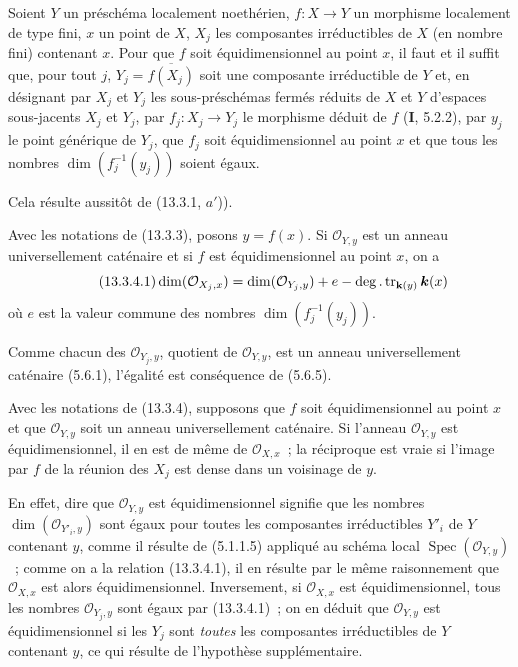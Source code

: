 \begin{proposition}[13.3.3]
\label{IV.13.3.3-fr}
Soient $Y$ un préschéma localement noethérien, $f:X\to Y$ un morphisme
localement de type fini, $x$ un point de $X$, $X_j$ les composantes
irréductibles de $X$ (en nombre fini) contenant $x$. Pour que $f$ soit
équidimensionnel au point $x$, il faut et il suffit que, pour tout $j$,
$Y_j=\overline{f(X_j)}$ soit une composante irréductible de $Y$ et, en
désignant par $X_j$ et $Y_j$ les sous-préschémas fermés réduits de $X$ et $Y$
d'espaces sous-jacents $X_j$ et $Y_j$, par $f_j:X_j\to Y_j$ le morphisme
déduit de $f$ \textup{(\textbf{I}, 5.2.2)}, par $y_j$ le point générique de $Y_j$, que
$f_j$ soit équidimensionnel au point $x$ et que tous les nombres
$\dim(f_j^{-1}(y_j))$ soient égaux.
\end{proposition}

Cela résulte aussitôt de (13.3.1, $a'$)).

\begin{corollary}[13.3.4]
\label{IV.13.3.4-fr}
Avec les notations de \textup{(13.3.3)}, posons $y=f(x)$. Si $\mathcal O_{Y,y}$ est un
anneau universellement caténaire et si $f$ est équidimensionnel au point $x$,
on a
\[
\tag{13.3.4.1}
\label{IV.13.3.4.1-fr}
  \dim(\mathcal O_{X_j,x})=\dim(\mathcal O_{Y_j,y})+e
  -\deg.\operatorname{tr}_{\mathbf{k}(y)}\boldsymbol{k}(x)
\]
où $e$ est la valeur commune des nombres $\dim(f_j^{-1}(y_j))$.
\end{corollary}

Comme chacun des $\mathcal O_{Y_j,y}$, quotient de $\mathcal O_{Y,y}$, est un
anneau universellement caténaire (5.6.1), l'égalité est conséquence de (5.6.5).

\begin{corollary}[13.3.5]
\label{IV.13.3.5-fr}
Avec les notations de \textup{(13.3.4)}, supposons que $f$ soit équidimensionnel au
point $x$ et que $\mathcal O_{Y,y}$ soit un anneau universellement caténaire.
Si l'anneau $\mathcal O_{Y,y}$ est équidimensionnel, il en est de même de
$\mathcal O_{X,x}$~; la réciproque est vraie si l'image par $f$ de la réunion
des $X_j$ est dense dans un voisinage de $y$.
\end{corollary}

En effet, dire que $\mathcal O_{Y,y}$ est équidimensionnel signifie que les
nombres $\dim(\mathcal O_{Y'_i,y})$ sont égaux pour toutes les composantes
irréductibles $Y'_i$ de $Y$ contenant $y$, comme il résulte de (5.1.1.5)
appliqué au schéma local $\operatorname{Spec}(\mathcal O_{Y,y})$~; comme on a
la relation (13.3.4.1), il en résulte par le même raisonnement que
$\mathcal O_{X,x}$ est alors équidimensionnel. Inversement, si
$\mathcal O_{X,x}$ est équidimensionnel, tous les nombres
$\mathcal O_{Y_j,y}$ sont égaux par (13.3.4.1)~; on en déduit que
$\mathcal O_{Y,y}$ est équidimensionnel si les $Y_j$ sont \emph{toutes} les
composantes irréductibles de $Y$ contenant $y$, ce qui résulte de l'hypothèse
supplémentaire.

